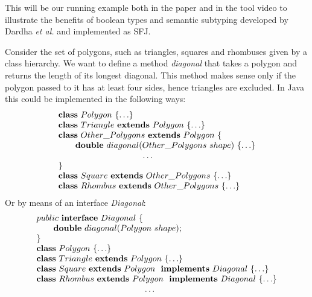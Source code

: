 \documentclass[runningheads]{llncs}
\begin{document}
\begin{example}[Polygons]
    \label{polygons}
    This will be our running example both in the paper and in the tool video \cite{UD20} to illustrate the benefits of boolean types and semantic subtyping developed by Dardha \emph{et al.} \cite{Dardha2013,Dardha2017} and implemented as SFJ.

    Consider the set of polygons, such as triangles, squares and rhombuses given by a class hierarchy.
    We want to define a method \emph{diagonal} that takes a polygon and returns the length of its longest diagonal. This method makes sense only if the polygon passed to it has at least four sides, hence triangles are excluded.
    In Java this could be implemented in the following ways:
    $$
        \begin{array}{l}
            \synclass Polygon \ \{ \ldots\}
            \\
            \syndecl{Triangle}{Polygon} {\ldots}
            \\
            \syndecl{Other\_Polygons}{Polygon} {
                \\
                \qquad \mathbf{double}\ diagonal(Other\_Polygons \ shape)\ \{\ldots \}
                \\
                \hspace{3.5cm} \ldots
                \\
            }
            \\
            \syndecl{Square}{Other\_Polygons}{\ldots}
            \\
            \syndecl{Rhombus}{Other\_Polygons} {\ldots}
        \end{array}
    $$
    Or by means of an interface \emph{Diagonal}:
    $$
        \begin{array}{l}
            public \ \syninterface Diagonal\ \{
            \\
            \qquad \mathbf{double}\ diagonal(Polygon \ shape);
            \\
            \}
            \\
            \synclass Polygon \ \{\ldots\}
            \\
            \syndecl{Triangle}{Polygon} {\ldots}
            \\
            \synidecl{Square}{Polygon} \synimpl Diagonal \ \{\ldots\}
            \\
            \synidecl{Rhombus}{Polygon} \synimpl Diagonal \ \{\ldots\}
            \\
            \hspace{4.5cm} \ldots
        \end{array}
    $$


\end{example}
\end{document}
